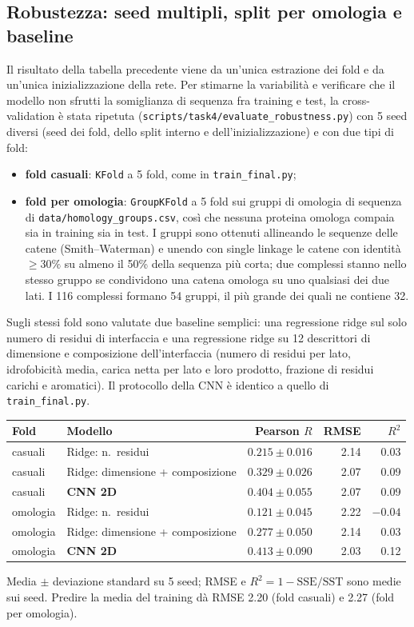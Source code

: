 \documentclass[11pt,a4paper]{article}
\begin{document}
\subsection{Robustezza: seed multipli, split per omologia e baseline}
\label{sec:task4-robustness}
Il risultato della tabella precedente viene da un'unica estrazione dei fold e da un'unica inizializzazione della rete. Per stimarne la variabilità e verificare che il modello non sfrutti la somiglianza di sequenza fra training e test, la cross-validation è stata ripetuta (\texttt{scripts/task4/evaluate\_robustness.py}) con 5 seed diversi (seed dei fold, dello split interno e dell'inizializzazione) e con due tipi di fold:
\begin{itemize}
    \item \textbf{fold casuali}: \texttt{KFold} a 5 fold, come in \texttt{train\_final.py};
    \item \textbf{fold per omologia}: \texttt{GroupKFold} a 5 fold sui gruppi di omologia di sequenza di \texttt{data/\allowbreak homology\_groups.csv}, così che nessuna proteina omologa compaia sia in training sia in test. I gruppi sono ottenuti allineando le sequenze delle catene (Smith--Waterman) e unendo con single linkage le catene con identità $\geq 30\%$ su almeno il 50\% della sequenza più corta; due complessi stanno nello stesso gruppo se condividono una catena omologa su uno qualsiasi dei due lati. I 116 complessi formano 54 gruppi, il più grande dei quali ne contiene 32.
\end{itemize}
Sugli stessi fold sono valutate due baseline semplici: una regressione ridge sul solo numero di residui di interfaccia e una regressione ridge su 12 descrittori di dimensione e composizione dell'interfaccia (numero di residui per lato, idrofobicità media, carica netta per lato e loro prodotto, frazione di residui carichi e aromatici). Il protocollo della CNN è identico a quello di \texttt{train\_final.py}.

\begin{center}
\begin{tabular}{llrrr}
\toprule
Fold & Modello & Pearson $R$ & RMSE & $R^2$ \\
\midrule
casuali & Ridge: n.\ residui & $0.215 \pm 0.016$ & 2.14 & 0.03 \\
casuali & Ridge: dimensione + composizione & $0.329 \pm 0.026$ & 2.07 & 0.09 \\
casuali & \textbf{CNN 2D} & $\mathbf{0.404 \pm 0.055}$ & 2.07 & 0.09 \\
\midrule
omologia & Ridge: n.\ residui & $0.121 \pm 0.045$ & 2.22 & $-0.04$ \\
omologia & Ridge: dimensione + composizione & $0.277 \pm 0.050$ & 2.14 & 0.03 \\
omologia & \textbf{CNN 2D} & $\mathbf{0.413 \pm 0.090}$ & 2.03 & 0.12 \\
\bottomrule
\end{tabular}
\end{center}
Media $\pm$ deviazione standard su 5 seed; RMSE e $R^2 = 1 - \mathrm{SSE}/\mathrm{SST}$ sono medie sui seed. Predire la media del training dà RMSE 2.20 (fold casuali) e 2.27 (fold per omologia).
\end{document}
